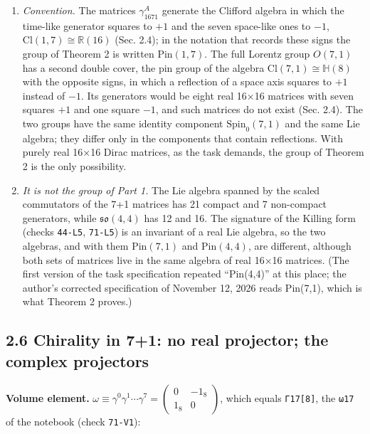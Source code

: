 \documentclass[
  10pt,
]{article}
\providecommand{\tightlist}{%
  \setlength{\itemsep}{0pt}\setlength{\parskip}{0pt}}
\begin{document}
\begin{enumerate}
\def\labelenumi{\arabic{enumi}.}
\tightlist
\item
  \emph{Convention.} The matrices \(\gamma_{1671}^A\) generate the
  Clifford algebra in which the time-like generator squares to \(+1\)
  and the seven space-like ones to \(-1\),
  \(\mathrm{Cl}(1,7)\cong\mathbb{R}(16)\) (Sec. 2.4); in the notation
  that records these signs the group of Theorem 2 is written
  \(\mathrm{Pin}(1,7)\). The full Lorentz group \(O(7,1)\) has a second
  double cover, the pin group of the algebra
  \(\mathrm{Cl}(7,1)\cong\mathbb{H}(8)\) with the opposite signs, in
  which a reflection of a space axis squares to \(+1\) instead of
  \(-1\). Its generators would be eight real 16×16 matrices with seven
  squares \(+1\) and one square \(-1\), and such matrices do not exist
  (Sec. 2.4). The two groups have the same identity component
  \(\mathrm{Spin}_0(7,1)\) and the same Lie algebra; they differ only in
  the components that contain reflections. With purely real 16×16 Dirac
  matrices, as the task demands, the group of Theorem 2 is the only
  possibility.
\item
  \emph{It is not the group of Part 1.} The Lie algebra spanned by the
  scaled commutators of the 7+1 matrices has 21 compact and 7
  non-compact generators, while \(\mathfrak{so}(4,4)\) has 12 and 16.
  The signature of the Killing form (checks \texttt{44-L5},
  \texttt{71-L5}) is an invariant of a real Lie algebra, so the two
  algebras, and with them \(\mathrm{Pin}(7,1)\) and
  \(\mathrm{Pin}(4,4)\), are different, although both sets of matrices
  live in the same algebra of real 16×16 matrices. (The first version of
  the task specification repeated ``Pin(4,4)'' at this place; the
  author's corrected specification of November 12, 2026 reads Pin(7,1),
  which is what Theorem 2 proves.)
\end{enumerate}

\hypertarget{chirality-in-71-no-real-projector-the-complex-projectors}{%
\subsection{2.6 Chirality in 7+1: no real projector; the complex
projectors}\label{chirality-in-71-no-real-projector-the-complex-projectors}}

\textbf{Volume element.}
\(\omega\equiv\gamma^0\gamma^1\cdots\gamma^7=\begin{pmatrix}0&-1_8\\1_8&0\end{pmatrix}\),
which equals \texttt{Γ17{[}8{]}}, the \texttt{ω17} of the notebook
(check \texttt{71-V1}):
\end{document}
